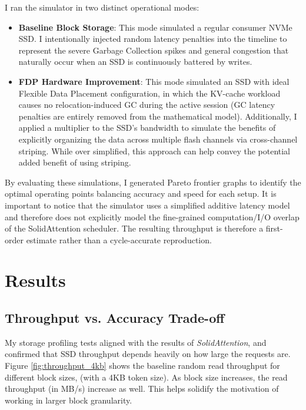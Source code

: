 \documentclass[conference]{IEEEtran}
\begin{document}
        I ran the simulator in two distinct operational modes:
        \begin{itemize}
            \item \textbf{Baseline Block Storage}: This mode simulated a regular consumer NVMe SSD. I intentionally injected random latency penalties into the timeline to represent the severe Garbage Collection spikes and general congestion that naturally occur when an SSD is continuously battered by writes.
            \item \textbf{FDP Hardware Improvement}: This mode simulated an SSD with ideal Flexible Data Placement configuration, in which the KV-cache workload causes no relocation-induced GC during the active session (GC latency penalties are entirely removed from the mathematical model). Additionally, I applied a multiplier to the SSD's bandwidth to simulate the benefits of explicitly organizing the data across multiple flash channels via cross-channel striping. While over simplified, this approach can help convey the potential added benefit of using striping.
        \end{itemize}

        By evaluating these simulations, I generated Pareto frontier graphs to identify the optimal operating points balancing accuracy and speed for each setup.
        It is important to notice that the simulator uses a simplified additive latency model and therefore does not explicitly model the fine-grained computation/I/O overlap of the SolidAttention scheduler. The resulting throughput is therefore a first-order estimate rather than a cycle-accurate reproduction.

\section{Results}

    \subsection{Throughput vs. Accuracy Trade-off}
        My storage profiling tests aligned with the results of \textit{SolidAttention}\cite{solidattention}, and confirmed that SSD throughput depends heavily on how large the requests are. Figure \ref{fig:throughput_4kb} shows the baseline random read throughput for different block sizes, (with a 4KB token size). As block size increases, the read throughput (in MB/s) increase as well. This helps solidify the motivation of working in larger block granularity.
\end{document}
